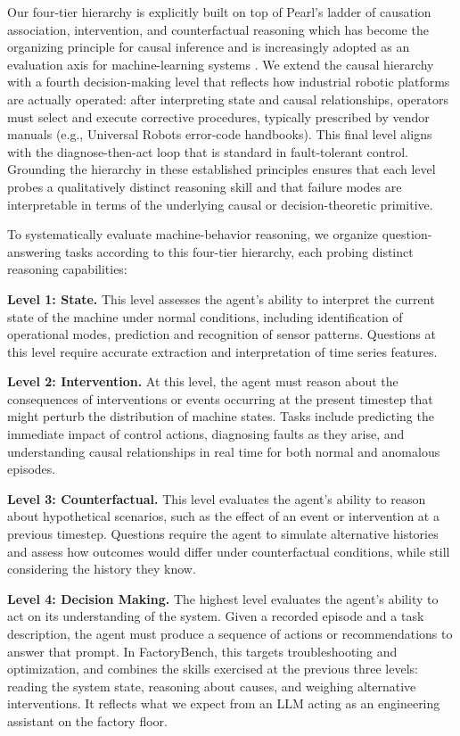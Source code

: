 \documentclass{article}
\begin{document}
Our four-tier hierarchy is explicitly built on top of Pearl's ladder of causation association, intervention, and counterfactual reasoning which has become the organizing principle for causal inference and is increasingly adopted as an evaluation axis for machine-learning systems \cite{pearl2009causality,peters2017elements,jin2023cladder,pawlowski2020deep_scm,peyrard2020ladder}. We extend the causal hierarchy with a fourth decision-making level that reflects how industrial robotic platforms are actually operated: after interpreting state and causal relationships, operators must select and execute corrective procedures, typically prescribed by vendor manuals (e.g., Universal Robots error-code handbooks). This final level aligns with the diagnose-then-act loop that is standard in fault-tolerant control. Grounding the hierarchy in these established principles ensures that each level probes a qualitatively distinct reasoning skill and that failure modes are interpretable in terms of the underlying causal or decision-theoretic primitive.

To systematically evaluate machine-behavior reasoning, we organize question-answering tasks according to this four-tier hierarchy, each probing distinct reasoning capabilities:

\textbf{Level 1: State.} This level assesses the agent's ability to interpret the current state of the machine under normal conditions, including identification of operational modes, prediction and recognition of sensor patterns. Questions at this level require accurate extraction and interpretation of time series features.

\textbf{Level 2: Intervention.} At this level, the agent must reason about the consequences of interventions or events occurring at the present timestep that might perturb the distribution of machine states. Tasks include predicting the immediate impact of control actions, diagnosing faults as they arise, and understanding causal relationships in real time for both normal and anomalous episodes.

\textbf{Level 3: Counterfactual.} This level evaluates the agent's ability to reason about hypothetical scenarios, such as the effect of an event or intervention at a previous timestep. Questions require the agent to simulate alternative histories and assess how outcomes would differ under counterfactual conditions, while still considering the history they know.

\textbf{Level 4: Decision Making.} The highest level evaluates the agent's ability to act on its understanding of the system. Given a recorded episode and a task description, the agent must produce a sequence of actions or recommendations to answer that prompt. In FactoryBench, this targets troubleshooting and optimization, and combines the skills exercised at the previous three levels: reading the system state, reasoning about causes, and weighing alternative interventions. It reflects what we expect from an LLM acting as an engineering assistant on the factory floor.
\end{document}
